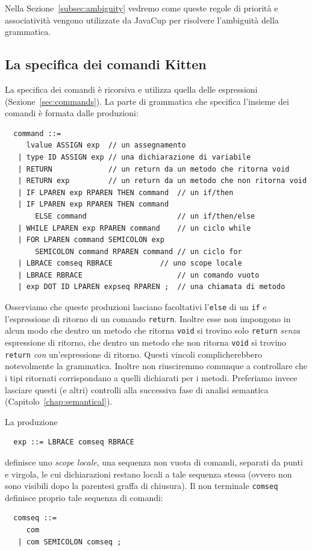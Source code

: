 Nella Sezione~\ref{subsec:ambiguity} vedremo come queste regole di priorit\`a e
associativit\`a vengono utilizzate da JavaCup per risolvere l'ambiguit\`a
della grammatica.
%
\subsection{La specifica dei comandi Kitten}
  \label{subsec:commands_specification}
%
La specifica dei comandi \`e ricorsiva e utilizza
quella delle espressioni (Sezione~\ref{sec:commands}).
La parte di grammatica che specifica l'insieme dei comandi \`e
formata dalle produzioni:
%
\begin{verbatim}
  command ::=
     lvalue ASSIGN exp  // un assegnamento
   | type ID ASSIGN exp // una dichiarazione di variabile
   | RETURN             // un return da un metodo che ritorna void
   | RETURN exp         // un return da un metodo che non ritorna void
   | IF LPAREN exp RPAREN THEN command  // un if/then
   | IF LPAREN exp RPAREN THEN command
       ELSE command                     // un if/then/else
   | WHILE LPAREN exp RPAREN command    // un ciclo while
   | FOR LPAREN command SEMICOLON exp
       SEMICOLON command RPAREN command // un ciclo for
   | LBRACE comseq RBRACE           // uno scope locale
   | LBRACE RBRACE                      // un comando vuoto
   | exp DOT ID LPAREN expseq RPAREN ;  // una chiamata di metodo
\end{verbatim}
%
Osserviamo che queste produzioni lasciano facoltativi
l'\texttt{else} di un \texttt{if} e l'espressione di ritorno di
un comando \texttt{return}. Inoltre esse non impongono
in alcun modo che dentro un metodo che ritorna \texttt{void}
si trovino solo \texttt{return} \emph{senza} espressione di ritorno,
\nec che dentro un metodo che non ritorna \texttt{void} si trovino
\texttt{return} \emph{con} un'espressione di ritorno. Questi vincoli
complicherebbero notevolmente la grammatica. Inoltre non riusciremmo
comunque a controllare che i tipi ritornati corrispondano a quelli
dichiarati per i metodi. Preferiamo invece lasciare questi
(e altri) controlli alla successiva fase di analisi semantica
(Capitolo~\ref{chap:semantical}).

La produzione
%
\begin{verbatim}
  exp ::= LBRACE comseq RBRACE
\end{verbatim}
%
definisce uno \emph{scope locale}, \cioe una sequenza non vuota di comandi,
separati da punti e virgola, le cui dichiarazioni restano locali
a tale sequenza stessa (ovvero non sono \piu visibili dopo la
parentesi graffa di chiusura). Il non terminale \texttt{comseq}
definisce proprio tale sequenza di comandi:
%
\begin{verbatim}
  comseq ::=
     com
   | com SEMICOLON comseq ;
\end{verbatim}
%
